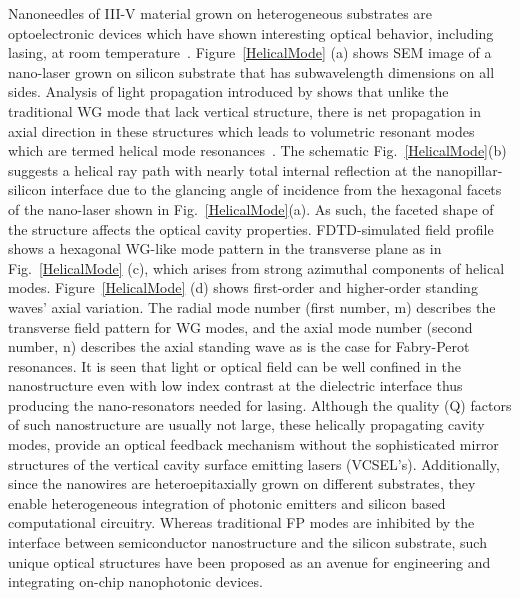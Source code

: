 Nanoneedles of III-V material grown on heterogeneous substrates are
optoelectronic devices which have shown interesting optical behavior, including
lasing, at room temperature~\cite{Chen:2011cg}. Figure~\ref{HelicalMode} (a)
shows SEM image of a nano-laser grown on silicon substrate that has
subwavelength dimensions on all sides. Analysis of light propagation introduced
by shows that unlike the traditional WG mode that lack vertical structure,
there is net propagation in axial direction in these structures which leads to
volumetric resonant modes which are termed helical mode
resonances~\cite{Chen:2011cg}. The schematic Fig.~\ref{HelicalMode}(b)
suggests a helical ray path with nearly total internal reflection at the
nanopillar-silicon interface due to the glancing angle of incidence from the
hexagonal facets of the nano-laser shown in Fig.~\ref{HelicalMode}(a). As such,
the faceted shape of the structure affects the optical cavity properties.
FDTD-simulated field profile shows a hexagonal WG-like mode pattern  in the
transverse plane as in Fig.~\ref{HelicalMode} (c), which arises from strong
azimuthal components of helical modes.  Figure~\ref{HelicalMode} (d) shows
first-order and higher-order standing waves’ axial variation. The radial mode
number (first number, m) describes the transverse field pattern for WG modes,
and the axial mode number (second number, n) describes the axial standing wave
as is the case for Fabry-Perot resonances. It is seen that light or optical
field can be well confined in the nanostructure even with low index contrast at
the dielectric interface thus producing the nano-resonators needed for lasing.
Although the quality (Q) factors of such nanostructure are usually not large,
these helically propagating cavity modes, provide an optical feedback mechanism
without the sophisticated mirror structures of the vertical cavity surface
emitting lasers (VCSEL’s). Additionally, since the nanowires are
heteroepitaxially grown on different substrates, they enable heterogeneous
integration of photonic emitters and silicon based computational circuitry.
Whereas traditional FP modes are inhibited by the interface between
semiconductor nanostructure and the silicon substrate, such unique optical
structures have been proposed as an avenue for engineering and integrating
on-chip nanophotonic devices.

